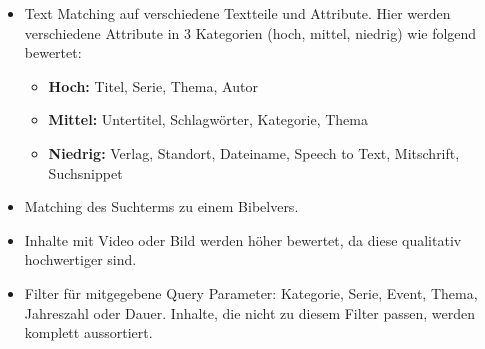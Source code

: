 \begin{itemize}
  \item Text Matching auf verschiedene Textteile und Attribute. Hier werden verschiedene Attribute in 3 Kategorien (hoch, mittel, niedrig) wie folgend bewertet:
  \begin{itemize}
    \item \textbf{Hoch:} Titel, Serie, Thema, Autor
    \item \textbf{Mittel:} Untertitel, Schlagwörter, Kategorie, Thema
    \item \textbf{Niedrig:} Verlag, Standort, Dateiname, Speech to Text, Mitschrift, Suchsnippet
  \end{itemize}
  \item Matching des Suchterms zu einem Bibelvers.
  \item Inhalte mit Video oder Bild werden höher bewertet, da diese qualitativ hochwertiger sind.
  \item Filter für mitgegebene Query Parameter: Kategorie, Serie, Event, Thema, Jahreszahl oder Dauer. Inhalte, die nicht zu diesem Filter passen, werden komplett aussortiert.
\end{itemize}
